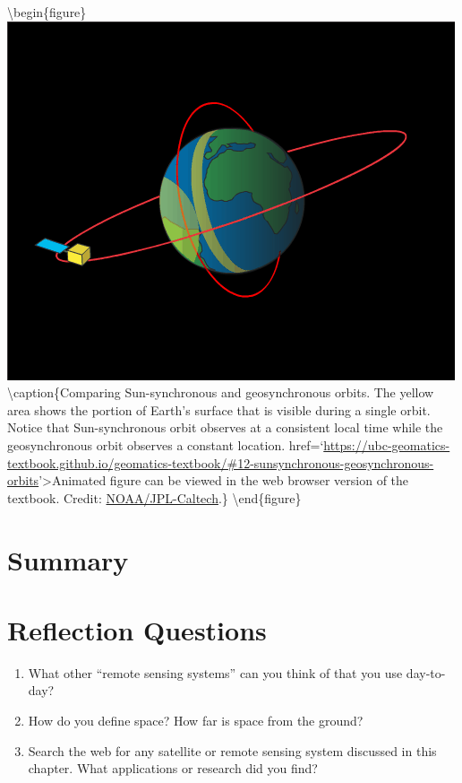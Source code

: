 \documentclass[
]{book}
\providecommand{\tightlist}{%
  \setlength{\itemsep}{0pt}\setlength{\parskip}{0pt}}
\begin{document}
\textbackslash begin\{figure\}
\includegraphics[width=0.75\linewidth]{images/12-sunsynchronous-geosynchronous-orbits} \textbackslash caption\{Comparing Sun-synchronous and geosynchronous orbits. The yellow area shows the portion of Earth's surface that is visible during a single orbit. Notice that Sun-synchronous orbit observes at a consistent local time while the geosynchronous orbit observes a constant location. href=`\url{https://ubc-geomatics-textbook.github.io/geomatics-textbook/\#12-sunsynchronous-geosynchronous-orbits}'\textgreater Animated figure can be viewed in the web browser version of the textbook. Credit: \href{https://scijinks.gov/about/}{NOAA/JPL-Caltech}.\}\label{fig:12-sunsynchronous-geosynchronous-orbits}
\textbackslash end\{figure\}

\hypertarget{summary-5}{%
\section{Summary}\label{summary-5}}

\hypertarget{reflection-questions-8}{%
\section*{Reflection Questions}\label{reflection-questions-8}}

\begin{enumerate}
\def\labelenumi{\arabic{enumi}.}
\tightlist
\item
  What other ``remote sensing systems'' can you think of that you use day-to-day?
\item
  How do you define space? How far is space from the ground?
\item
  Search the web for any satellite or remote sensing system discussed in this chapter. What applications or research did you find?
\end{enumerate}
\end{document}
